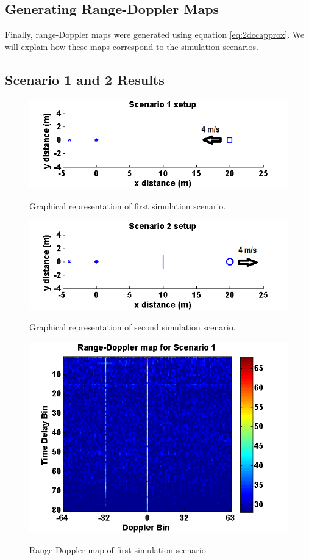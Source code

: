 \documentclass[article,11pt,onecolumn,final]{IEEEtran}
\begin{document}
\subsection{Generating Range-Doppler Maps}
Finally, range-Doppler maps were generated using equation \eqref{eq:2dccapprox}. We will explain how these maps correspond to the simulation scenarios.

\subsection{Scenario 1 and 2 Results}

\begin{figure}[H]
	\caption{Graphical representation of first simulation scenario.}
	\centering
	\includegraphics[width=400pt]{figures/sim1.png}
	\label{fig:sim1}
\end{figure}

\begin{figure}[H]
	\caption{Graphical representation of second simulation scenario.}
	\centering
	\includegraphics[width=400pt]{figures/sim2.png}
	\label{fig:sim2}
\end{figure}

\begin{figure}[H]
	\caption{Range-Doppler map of first simulation scenario}
	\centering
	\includegraphics[width=400pt]{figures/rdm1.png}
	\label{fig:rdm1}
\end{figure}
\end{document}
